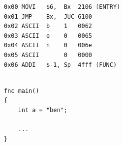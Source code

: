 \documentclass[11pt,a4paper]{report}
\begin{document}
\begin{figure}[H]
    \begin{minipage}{0.5\textwidth}
        \centering
\begin{verbatim}
0x00 MOVI   $6,  Bx  2106 (ENTRY)
0x01 JMP    Bx,  JUC 6100 
0x02 ASCII  b    1   0062 
0x03 ASCII  e    0   0065 
0x04 ASCII  n    0   006e 
0x05 ASCII       0   0000 
0x06 ADDI   $-1, Sp  4fff (FUNC)
\end{verbatim}
        \label{fig:}
    \end{minipage}
    \begin{minipage}{0.05\textwidth}\hfill\end{minipage}
    \begin{minipage}{0.5\textwidth}
        \centering
\begin{verbatim}

fnc main() 
{
    int a = "ben";
    
    ...
}
\end{verbatim}
        \label{fig:}
    \end{minipage}
    \label{fig:compiler_cg_strings}
\end{figure}
\end{document}
